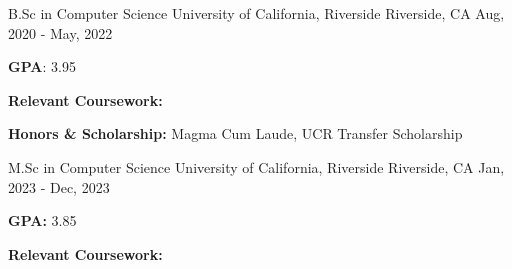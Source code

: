 
\begin{cventries}
  \cventry
    {B.Sc in Computer Science} %
    {University of California, Riverside} %
    {Riverside, CA} %
    {Aug, 2020 -  May, 2022} %
    {
      \begin{cvitems} %
        \item [] {\textbf{GPA}: 3.95}
        \item [] {
          \begin{flushleft}
            \textbf{Relevant Coursework:}
          \end{flushleft}
        }
        \item [] {\textbf{Honors \& Scholarship:} Magma Cum Laude, UCR Transfer Scholarship}
      \end{cvitems}
    }
    
  \cventry
    {M.Sc in Computer Science } %
    {University of California, Riverside} %
    {Riverside, CA} %
    {Jan, 2023 - Dec, 2023} %
    {
      \begin{cvitems}
      \item [] {\textbf{GPA:} 3.85}
      \item [] {
          \begin{flushleft}
            \textbf{Relevant Coursework:}
          \end{flushleft}
        }
      \end{cvitems}
    }
\end{cventries}
